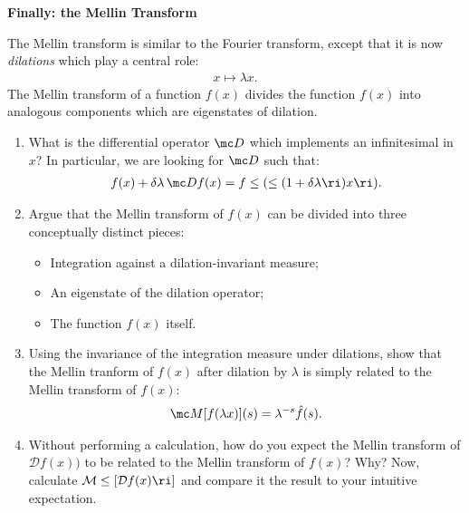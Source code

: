 \begin{exercise}
    \textbf{Finally: the Mellin Transform}

    The Mellin transform is similar to the Fourier transform, except that it is now \emph{dilations} which play a central role:
    \begin{align}
        x \mapsto \lambda x
        .
    \end{align}
    The Mellin transform of a function \(f(x)\) divides the function \(f(x)\) into analogous components which are eigenstates of dilation.

    \begin{enumerate}[label=\roman*)]
        \item
            What is the differential operator \(\mc D\) which implements an infinitesimal  in \(x\)?
            In particular, we are looking for \(\mc D\) such that:
            \begin{align}
                f(x) + \delta \lambda \, \mc D f(x)
                =
                f\le(\le(1 + \delta \lambda\ri)x\ri)
                .
            \end{align}

        \item
            Argue that the Mellin transform of \(f(x)\) can be divided into three conceptually distinct pieces:
            \begin{itemize}
                \item
                    Integration against a dilation-invariant measure;

                \item
                    An eigenstate of the dilation operator;

                \item
                    The function \(f(x)\) itself.
            \end{itemize}

        \item
            Using the invariance of the integration measure under dilations, show that the Mellin tranform of \(f(x)\) after dilation by \(\lambda\) is simply related to the Mellin transform of \(f(x)\):
            \begin{align}
                \mc M[f(\lambda x)](s) = \lambda^{-s} \hat f(s)
                .
            \end{align}

        \item
            Without performing a calculation, how do you expect the Mellin transform of \(\mathcal{D} f(x))\) to be related to the Mellin transform of \(f(x)\)?
            Why?
            Now, calculate \(\mathcal{M}\le[\mathcal{D} f(x)\ri]\) and compare it the result to your intuitive expectation.
    \end{enumerate}
\end{exercise}



